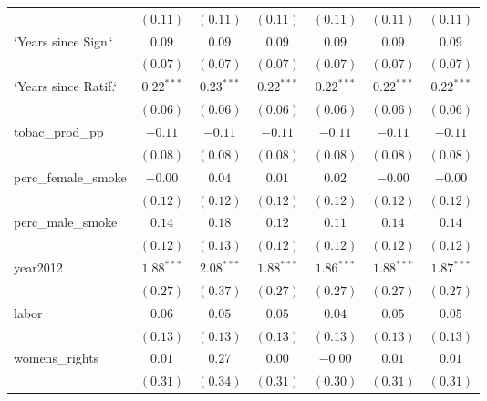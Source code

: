 \begin{table}[!h]
\begin{center}
\begin{tabular}{l c c c c c c }
                        & $(0.11)$     & $(0.11)$     & $(0.11)$     & $(0.11)$     & $(0.11)$     & $(0.11)$     \\
`Years since Sign.`     & $0.09$       & $0.09$       & $0.09$       & $0.09$       & $0.09$       & $0.09$       \\
                        & $(0.07)$     & $(0.07)$     & $(0.07)$     & $(0.07)$     & $(0.07)$     & $(0.07)$     \\
`Years since Ratif.`    & $0.22^{***}$ & $0.23^{***}$ & $0.22^{***}$ & $0.22^{***}$ & $0.22^{***}$ & $0.22^{***}$ \\
                        & $(0.06)$     & $(0.06)$     & $(0.06)$     & $(0.06)$     & $(0.06)$     & $(0.06)$     \\
tobac\_prod\_pp         & $-0.11$      & $-0.11$      & $-0.11$      & $-0.11$      & $-0.11$      & $-0.11$      \\
                        & $(0.08)$     & $(0.08)$     & $(0.08)$     & $(0.08)$     & $(0.08)$     & $(0.08)$     \\
perc\_female\_smoke     & $-0.00$      & $0.04$       & $0.01$       & $0.02$       & $-0.00$      & $-0.00$      \\
                        & $(0.12)$     & $(0.12)$     & $(0.12)$     & $(0.12)$     & $(0.12)$     & $(0.12)$     \\
perc\_male\_smoke       & $0.14$       & $0.18$       & $0.12$       & $0.11$       & $0.14$       & $0.14$       \\
                        & $(0.12)$     & $(0.13)$     & $(0.12)$     & $(0.12)$     & $(0.12)$     & $(0.12)$     \\
year2012                & $1.88^{***}$ & $2.08^{***}$ & $1.88^{***}$ & $1.86^{***}$ & $1.88^{***}$ & $1.87^{***}$ \\
                        & $(0.27)$     & $(0.37)$     & $(0.27)$     & $(0.27)$     & $(0.27)$     & $(0.27)$     \\
labor                   & $0.06$       & $0.05$       & $0.05$       & $0.04$       & $0.05$       & $0.05$       \\
                        & $(0.13)$     & $(0.13)$     & $(0.13)$     & $(0.13)$     & $(0.13)$     & $(0.13)$     \\
womens\_rights          & $0.01$       & $0.27$       & $0.00$       & $-0.00$      & $0.01$       & $0.01$       \\
                        & $(0.31)$     & $(0.34)$     & $(0.31)$     & $(0.30)$     & $(0.31)$     & $(0.31)$     \\

\end{tabular}
\end{center}
\end{table}
